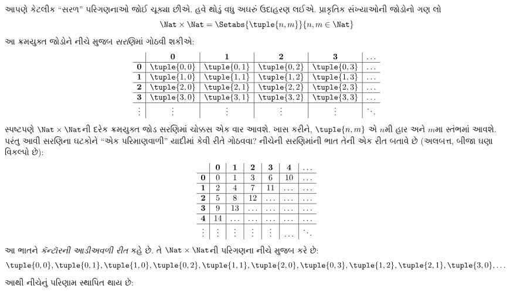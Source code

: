 \documentclass[../../../include/open-logic-section]{subfiles}
\begin{document}


\begin{explain}
આપણે કેટલીક “સરળ” પરિગણનાઓ જોઈ ચૂક્યા છીએ. હવે
થોડું વધુ અઘરું ઉદાહરણ લઈએ. પ્રાકૃતિક સંખ્યાઓની
જોડોનો ગણ લો
\[
\Nat \times \Nat = \Setabs{\tuple{n,m}}{n,m \in \Nat}
\]
આ ક્રમયુક્ત જોડોને નીચે મુજબ \emph{સરણિ}માં ગોઠવી શકીએ:
\[
\begin{array}{ c | c | c | c | c | c}
& \mathbf 0 & \mathbf 1 & \mathbf 2 & \mathbf 3 & \dots \\
\hline
\mathbf 0 & \tuple{0,0} & \tuple{0,1} & \tuple{0,2} & \tuple{0,3} & \dots \\
\hline
\mathbf 1 & \tuple{1,0} & \tuple{1,1} & \tuple{1,2} & \tuple{1,3} & \dots \\
\hline
\mathbf 2 & \tuple{2,0} & \tuple{2,1} & \tuple{2,2} & \tuple{2,3} & \dots \\
\hline
\mathbf 3 & \tuple{3,0} & \tuple{3,1} & \tuple{3,2} & \tuple{3,3} & \dots \\
\hline
\vdots & \vdots & \vdots & \vdots & \vdots & \ddots\\
\end{array}
\]
સ્પષ્ટપણે $\Nat \times \Nat$ની દરેક ક્રમયુક્ત જોડ
સરણિમાં ચોક્કસ એક વાર આવશે. ખાસ કરીને,
$\tuple{n,m}$ એ $n$મી હાર અને $m$મા સ્તંભમાં આવશે.
પરંતુ આવી સરણિના ઘટકોને “એક પરિમાણવાળી” યાદીમાં
કેવી રીતે ગોઠવવા? નીચેની સરણિમાંની ભાત તેની એક રીત
બતાવે છે (અલબત્ત, બીજા ઘણા વિકલ્પો છે):
\[
\begin{array}{ c | c | c | c | c | c | c}
& \mathbf 0 & \mathbf 1 & \mathbf 2 & \mathbf 3 & \mathbf 4 &\dots \\
\hline
\mathbf 0 & 0  & 1& 3 & 6& 10 &\ldots \\
\hline
\mathbf 1 &2 & 4& 7 & 11 & \dots &\ldots \\
\hline
\mathbf 2 & 5 & 8 & 12 & \ldots & \dots&\ldots \\
\hline
\mathbf 3 & 9 & 13 & \ldots & \ldots & \dots & \ldots \\
\hline
\mathbf 4 & 14 & \ldots & \ldots & \ldots & \dots & \ldots \\
\hline
\vdots & \vdots & \vdots & \vdots & \vdots&\ldots & \ddots\\
\end{array}
\]\noindent
આ ભાતને \emph{કૅન્ટૉરની આડીઅવળી રીત} કહે છે.
તે $\Nat \times \Nat$ની પરિગણના નીચે મુજબ કરે છે:
\[
\tuple{0,0}, \tuple{0,1}, \tuple{1,0}, \tuple{0,2}, \tuple{1,1},
\tuple{2,0}, \tuple{0,3}, \tuple{1,2}, \tuple{2,1}, \tuple{3,0}, \dots
\]
આથી નીચેનું પરિણામ સ્થાપિત થાય છે:
\end{explain}
\end{document}
